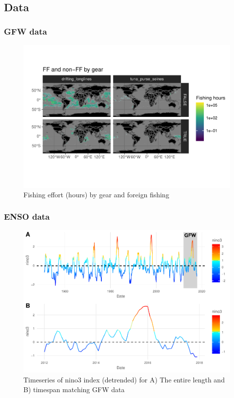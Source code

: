 \documentclass[]{article}
\begin{document}
\hypertarget{data}{%
\subsection{Data}\label{data}}

\hypertarget{gfw-data}{%
\subsubsection{GFW data}\label{gfw-data}}

\begin{figure}
\centering
\includegraphics{Oremus_Villasenor-Derbez_files/figure-latex/unnamed-chunk-3-1.pdf}
\caption{Fishing effort (hours) by gear and foreign fishing}
\end{figure}

\hypertarget{enso-data}{%
\subsubsection{ENSO data}\label{enso-data}}

\begin{figure}
\centering
\includegraphics{Oremus_Villasenor-Derbez_files/figure-latex/unnamed-chunk-5-1.pdf}
\caption{Timeseries of nino3 index (detrended) for A) The entire length
and B) timespan matching GFW data}
\end{figure}
\end{document}

